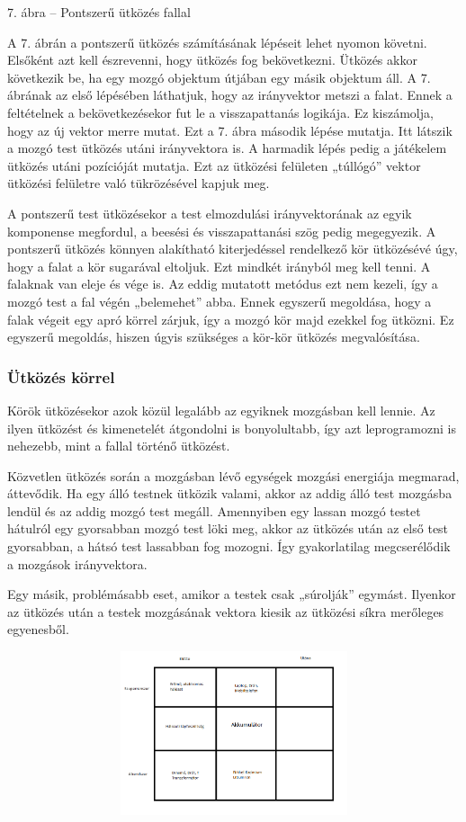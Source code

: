 \documentclass[]{article}
\begin{document}
7. ábra -- Pontszerű ütközés fallal

A 7. ábrán a pontszerű ütközés számításának lépéseit lehet nyomon
követni. Elsőként azt kell észrevenni, hogy ütközés fog bekövetkezni.
Ütközés akkor következik be, ha egy mozgó objektum útjában egy másik
objektum áll. A 7. ábrának az első lépésében láthatjuk, hogy az
irányvektor metszi a falat. Ennek a feltételnek a bekövetkezésekor fut
le a visszapattanás logikája. Ez kiszámolja, hogy az új vektor merre
mutat. Ezt a 7. ábra második lépése mutatja. Itt látszik a mozgó test
ütközés utáni irányvektora is. A harmadik lépés pedig a játékelem
ütközés utáni pozícióját mutatja. Ezt az ütközési felületen „túllógó''
vektor ütközési felületre való tükrözésével kapjuk meg.

A pontszerű test ütközésekor a test elmozdulási irányvektorának az egyik
komponense megfordul, a beesési és visszapattanási szög pedig
megegyezik. A pontszerű ütközés könnyen alakítható kiterjedéssel
rendelkező kör ütközésévé úgy, hogy a falat a kör sugarával eltoljuk.
Ezt mindkét irányból meg kell tenni. A falaknak van eleje és vége is. Az
eddig mutatott metódus ezt nem kezeli, így a mozgó test a fal végén
„belemehet'' abba. Ennek egyszerű megoldása, hogy a falak végeit egy
apró körrel zárjuk, így a mozgó kör majd ezekkel fog ütközni. Ez
egyszerű megoldás, hiszen úgyis szükséges a kör-kör ütközés
megvalósítása.


\subsubsection{Ütközés körrel}

Körök ütközésekor azok közül legalább az egyiknek mozgásban kell lennie.
Az ilyen ütközést és kimenetelét átgondolni is bonyolultabb, így azt
leprogramozni is nehezebb, mint a fallal történő ütközést.

Közvetlen ütközés során a mozgásban lévő egységek mozgási energiája
megmarad, áttevődik. Ha egy álló testnek ütközik valami, akkor az addig
álló test mozgásba lendül és az addig mozgó test megáll. Amennyiben egy
lassan mozgó testet hátulról egy gyorsabban mozgó test löki meg, akkor
az ütközés után az első test gyorsabban, a hátsó test lassabban fog
mozogni. Így gyakorlatilag megcserélődik a mozgások irányvektora.

Egy másik, problémásabb eset, amikor a testek csak „súrolják'' egymást.
Ilyenkor az ütközés után a testek mozgásának vektora kiesik az ütközési
síkra merőleges egyenesből.

\includegraphics[width=5.51181in,height=1.89525in]{media/image4.png}
\end{document}
